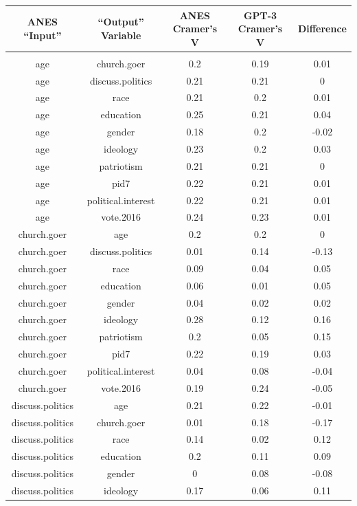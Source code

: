 \documentclass[11pt]{article}
\begin{document}
\begin{table}[!htbp] \centering
\renewcommand{\arraystretch}{0.9}
\begin{tabular}{@{\extracolsep{5pt}} ccccc}
\toprule{}
ANES ``Input'' & ``Output'' Variable & ANES Cramer's V & GPT-3 Cramer's V & Difference \\
\hline \\[-1.8ex]
age & church.goer & 0.2 & 0.19 & 0.01 \\
age & discuss.politics & 0.21 & 0.21 & 0 \\
age & race & 0.21 & 0.2 & 0.01 \\
age & education & 0.25 & 0.21 & 0.04 \\
age & gender & 0.18 & 0.2 & -0.02 \\
age & ideology & 0.23 & 0.2 & 0.03 \\
age & patriotism & 0.21 & 0.21 & 0 \\
age & pid7 & 0.22 & 0.21 & 0.01 \\
age & political.interest & 0.22 & 0.21 & 0.01 \\
age & vote.2016 & 0.24 & 0.23 & 0.01 \\
church.goer & age & 0.2 & 0.2 & 0 \\
church.goer & discuss.politics & 0.01 & 0.14 & -0.13 \\
church.goer & race & 0.09 & 0.04 & 0.05 \\
church.goer & education & 0.06 & 0.01 & 0.05 \\
church.goer & gender & 0.04 & 0.02 & 0.02 \\
church.goer & ideology & 0.28 & 0.12 & 0.16 \\
church.goer & patriotism & 0.2 & 0.05 & 0.15 \\
church.goer & pid7 & 0.22 & 0.19 & 0.03 \\
church.goer & political.interest & 0.04 & 0.08 & -0.04 \\
church.goer & vote.2016 & 0.19 & 0.24 & -0.05 \\
discuss.politics & age & 0.21 & 0.22 & -0.01 \\
discuss.politics & church.goer & 0.01 & 0.18 & -0.17 \\
discuss.politics & race & 0.14 & 0.02 & 0.12 \\
discuss.politics & education & 0.2 & 0.11 & 0.09 \\
discuss.politics & gender & 0 & 0.08 & -0.08 \\
discuss.politics & ideology & 0.17 & 0.06 & 0.11 \\

\end{tabular}
\end{table}
\end{document}
